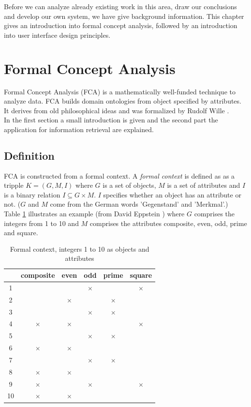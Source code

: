 \documentclass[11pt]{report}
\begin{document}
Before we can analyze already existing work in this area, draw our conclusions and develop our own system, we have give background information. This chapter gives an introduction into formal concept analysis, followed by an introduction into user interface design principles.

\section{Formal Concept Analysis}

Formal Concept Analysis (FCA) is a mathematically well-funded technique to analyze data. FCA builds domain ontologies from object specified by attributes. It derives from old philosophical ideas and was formalized by Rudolf Wille \cite{Ganter2012}. \\

In the first section a small introduction is given and the second part the application for information retrieval are explained.

\subsection{Definition}

FCA is constructed from a formal context. A \textit{formal context} is defined as as a tripple $K = (G, M, I)$ where $G$ is a set of objects, $M$ is a set of attributes and $I$ is a binary relation $I \subseteq G \times M$. $I$ specifies whether an object has an attribute or not. ($G$ and $M$ come from the German words 'Gegenstand' and 'Merkmal'.) \\

Table \ref{table:example} illustrates an example (from David Eppstein \cite{fcaexample}) where $G$ comprises the integers from 1 to 10 and $M$ comprises the attributes composite, even, odd, prime and square. \\


\begin{table}[h]
\caption{Formal context, integers 1 to 10 as objects and attributes}
\label{table:example}
\centering

\def\arraystretch{1.2}%
\begin{tabular}{ | c | c c c c c |}
\hline
  & composite & even & odd & prime & square\\
\hline

1 & & & $\times$ & &$\times$\\ 
2 & & $\times$ & & $\times$ &\\
3 & & & $\times$ & $\times$ &\\ 
4 & $\times$ & $\times$ & & & $\times$\\
5 & & & $\times$ & $\times$ &\\
6 & $\times$ & $\times$ & & &\\
7 & & & $\times$ & $\times$ &\\ 
8 & $\times$ & $\times$ & & &\\
9 & $\times$ & & $\times$ & & $\times$\\
10 & $\times$ & $\times$ & & &\\ \hline


\end{tabular}
\end{table}
\end{document}
